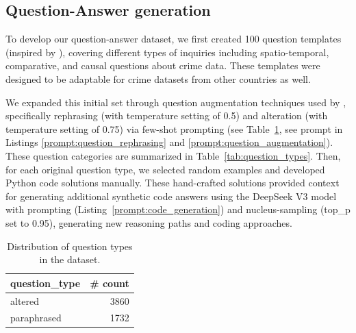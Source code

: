 \subsection{Question-Answer generation}

To develop our question-answer dataset, we first created 100 question templates (inspired by \citep{Dai2024QASTKG, Contractor2020QATourism}), covering different types of inquiries including spatio-temporal, comparative, and causal questions about crime data. These templates were designed to be adaptable for crime datasets from other countries as well.

We expanded this initial set through question augmentation techniques used by \cite{Yin2024MuMathCode, Li2024MuggleMath, Jain2024MetaFineTuning}, specifically rephrasing (with temperature setting of 0.5) and alteration (with temperature setting of 0.75) via few-shot prompting (see Table~\ref{tab:question_type_counts}, see prompt in Listings \ref{prompt:question_rephrasing} and \ref{prompt:question_augmentation}). These question categories are summarized in Table~\ref{tab:question_types}. Then, for each original question type, we selected random examples and developed Python code solutions manually. These hand-crafted solutions provided context for generating additional synthetic code answers using the DeepSeek V3 model with prompting (Listing~\ref{prompt:code_generation}) and nucleus-sampling \citep{Holtzman2020NucleusSampling, Ahmad2025OCRNVidia, Nvidia2024KaggleMath} (top\_p set to 0.95), generating new reasoning paths and coding approaches.


\begin{table}[H]
\centering
\begin{tabular}{lr}
\hline
\textbf{question\_type} & \textbf{\# count} \\
\hline
altered     & 3860 \\
paraphrased & 1732 \\
\hline
\end{tabular}
\caption{Distribution of question types in the dataset.}
\label{tab:question_type_counts}
\end{table}

